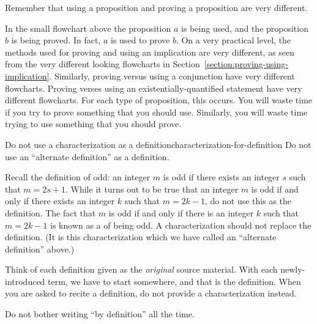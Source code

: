 \documentclass{book}
\theoremstyle{ekimcustom}
\newcommand\defn[1]{{\color{blue}{\bf #1}}}
\begin{document}
\begin{bhabit}{}{}
Remember that using a proposition and proving a proposition are very different. %
\end{bhabit}
\begin{center}
\end{center}
In the small flowchart above the proposition $a$ is being used, and the proposition $b$ is being proved. In fact, $a$ is used to prove $b$. On a very practical level, the methods used for proving and using an implication are very different, as seen from the very different looking flowcharts in Section~\ref{section:proving-using-implication}. Similarly, proving versus using a conjunction have very different flowcharts. Proving verses using an existentially-quantified statement have very different flowcharts. For each type of proposition, this occurs. You will waste time if you try to prove something that you should use. Similarly, you will waste time trying to use something that you should prove.

\begin{bhabit}{Do not use a characterization as a definition}{characterization-for-definition}
Do not use an ``alternate definition'' as a definition.
\end{bhabit}
Recall the definition of odd: an integer $m$ is odd if there exists an integer $s$ such that $m=2s+1$. While it turns out to be true that an integer $m$ is odd if and only if there exists an integer $k$ such that $m=2k-1$, do not use this as the definition. The fact that $m$ is odd if and only if there is an integer $k$ such that $m=2k-1$ is known as a \defn{characterization} of being odd. A characterization should not replace the definition. (It is this characterization which we have called an ``alternate definition'' above.)

Think of each definition given as the \emph{original} source material. With each newly-introduced term, we have to start somewhere, and that is the definition. When you are asked to recite a definition, do not provide a characterization instead.

\begin{bhabit}{}{}
Do not bother writing ``by definition'' all the time.
\end{bhabit}
\end{document}
